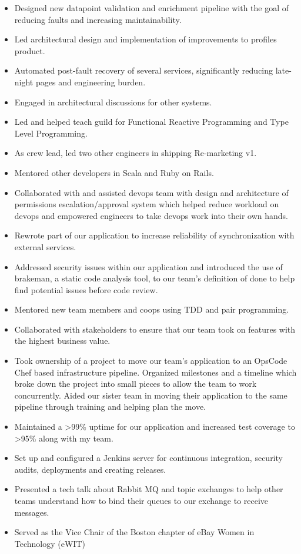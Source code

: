 \documentclass[10pt,letterpaper]{altacv}
\begin{document}
\begin{itemize}
\item Designed new datapoint validation and enrichment pipeline with the goal of reducing faults and increasing maintainability.
\item Led architectural design and implementation of improvements to profiles product.
\item Automated post-fault recovery of several services, significantly reducing late-night pages and engineering burden.
\item Engaged in architectural discussions for other systems.
\item Led and helped teach guild for Functional Reactive Programming and Type Level Programming.
\item As crew lead, led two other engineers in shipping Re-marketing v1.
\item Mentored other developers in Scala and Ruby on Rails.
\item Collaborated with and assisted devops team with design and architecture of permissions escalation/approval system which helped reduce workload on devops and empowered engineers to take devops work into their own hands.
\end{itemize}

\divider

\begin{itemize}
\item Rewrote part of our application to increase reliability of synchronization with external services.
\item Addressed security issues within our application and introduced the use of brakeman, a static code analysis tool, to our team's definition of done to help find potential issues before code review.
\item Mentored new team members and coops using TDD and pair programming.
\item Collaborated with stakeholders to ensure that our team took on features with the highest business value.
\item Took ownership of a project to move our team's application to an OpsCode Chef based infrastructure pipeline. Organized milestones and a timeline which broke down the project into small pieces to allow the team to work concurrently. Aided our sister team in moving their application to the same pipeline through training and helping plan the move.
\item Maintained a >99\% uptime for our application and increased test coverage to >95\% along with my team.
\item Set up and configured a Jenkins server for continuous integration, security audits, deployments and creating releases.
\item Presented a tech talk about Rabbit MQ and topic exchanges to help other teams understand how to bind their queues to our exchange to receive messages.
\item Served as the Vice Chair of the Boston chapter of eBay Women in Technology (eWIT)
\end{itemize}
\end{document}
